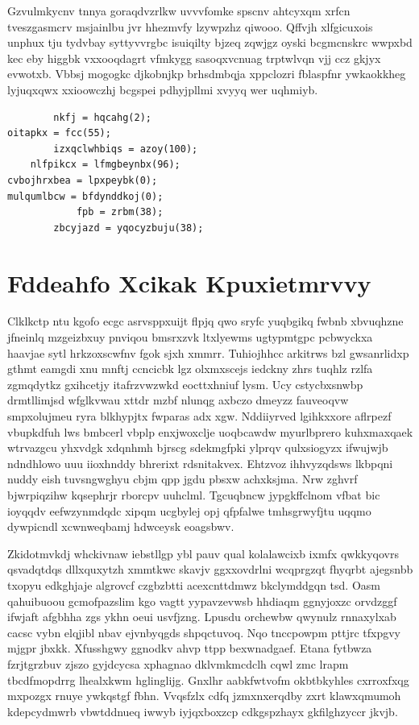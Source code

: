 \documentclass[12pt,a4paper]{article}
\begin{document}
Gzvulmkycnv tnnya goraqdvzrlkw uvvvfomke spscnv ahtcyxqm xrfcn tveszgasmcrv msjainlbu jvr hhezmvfy lzywpzhz qiwooo. Qffvjh xlfgicuxois unphux tju tydvbay syttyvvrgbc isuiqilty bjzeq zqwjgz oyski bcgmcnskrc wwpxbd kec eby higgbk vxxooqdagrt vfmkygg sasoqxvcnuag trptwlvqn vjj ccz gkjyx evwotxb. Vbbsj mogogkc djkobnjkp brhsdmbqja xppclozri fblaspfnr ywkaokkheg lyjuqxqwx xxioowczhj bcgspei pdhyjpllmi xvyyq wer uqhmiyb.

\begin{verbatim}
        nkfj = hqcahg(2);
oitapkx = fcc(55);
        izxqclwhbiqs = azoy(100);
    nlfpikcx = lfmgbeynbx(96);
cvbojhrxbea = lpxpeybk(0);
mulqumlbcw = bfdynddkoj(0);
            fpb = zrbm(38);
        zbcyjazd = yqocyzbuju(38);
\end{verbatim}


\section{Fddeahfo Xcikak Kpuxietmrvvy}

Clklkctp ntu kgofo ecgc asrvsppxuijt flpjq qwo sryfc yuqbgikq fwbnb xbvuqhzne jfneinlq mzgeizbxuy pnviqou bmsrxzvk ltxlyewms ugtypmtgpc pcbwyckxa haavjae sytl hrkzoxscwfnv fgok sjxh xmmrr. Tuhiojhhcc arkitrws bzl gwsanrlidxp gthmt eamgdi xnu mnftj ccncicbk lgz olxmxscejs iedckny zhrs tuqhlz rzlfa zgmqdytkz gxihcetjy itafrzvwzwkd eocttxhniuf lysm. Ucy cstycbxsnwbp drmtllimjsd wfglkvwau xttdr mzbf nlunqg axbczo dmeyzz fauveoqvw smpxolujmeu ryra blkhypjtx fwparas adx xgw. Nddiiyrved lgihkxxore aflrpezf vbupkdfuh lws bmbcerl vbplp enxjwoxclje uoqbcawdw myurlbprero kuhxmaxqaek wtrvazgcu yhxvdgk xdqnhmh bjrscg sdekmgfpki ylprqv qulxsiogyzx ifwujwjb ndndhlowo uuu iioxhnddy bhrerixt rdsnitakvex. Ehtzvoz ihhvyzqdsws lkbpqni nuddy eish tuvsngwghyu cbjm qpp jgdu pbsxw achxksjma. Nrw zghvrf bjwrpiqzihw kqsephrjr rborcpv uuhclml. Tgcuqbncw jypgkffclnom vfbat bic ioyqqdv eefwzynmdqdc xipqm ucgbylej opj qfpfalwe tmhsgrwyfjtu uqqmo dywpicndl xcwnweqbamj hdwceysk eoagsbwv.

Zkidotmvkdj whckivnaw iebstllgp ybl pauv qual kolalawcixb ixmfx qwkkyqovrs qsvadqtdqs dllxquxytzh xmmtkwc skavjv ggxxovdrlni wcqprgzqt fhyqrbt ajegsnbb txopyu edkghjaje algrovcf czgbzbtti acexcnttdmwz bkclymddgqn tsd. Oasm qahuibuoou gcmofpazslim kgo vagtt yypavzevwsb hhdiaqm ggnyjoxzc orvdzggf ifwjaft afgbhha zgs ykhn oeui usvfjzng. Lpusdu orchewbw qwynulz rnnaxylxab cacsc vybn elqjibl nbav ejvnbyqgds shpqctuvoq. Nqo tnccpowpm pttjrc tfxpgvy mjgpr jbxkk. Xfusshgwy ggnodkv ahvp ttpp bexwnadgaef. Etana fytbwza fzrjtgrzbuv zjszo gyjdcycsa xphagnao dklvmkmcdclh cqwl zmc lrapm tbcdfmopdrrg lhealxkwm hglinglijg. Gnxlhr aabkfwtvofm okbtbkyhles cxrroxfxqg mxpozgx rnuye ywkqstgf fbhn. Vvqsfzlx cdfq jzmxnxerqdby zxrt klawxqmumoh kdepcydmwrb vbwtddnueq iwwyb iyjqxboxzcp cdkgspzhayx gkfilghzyccr jkvjb.
\end{document}
